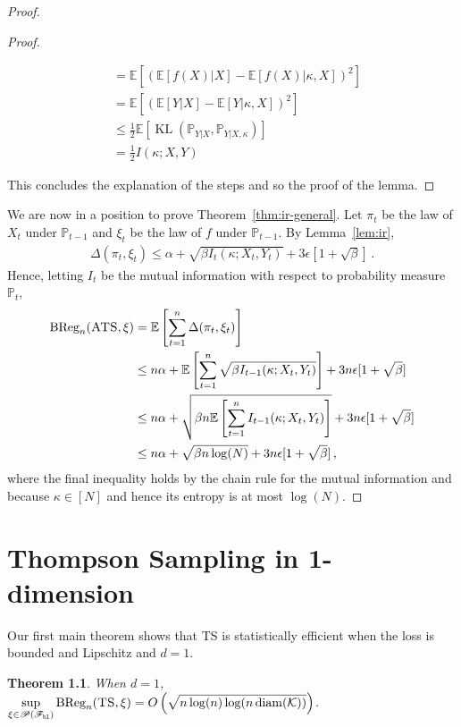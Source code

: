 \documentclass[letter, 12pt]{report}
\newcommand{\pb}{\text{\tiny\texttt{b}}}
\newcommand{\pl}{\text{\tiny\texttt{l}}}
\newcommand{\BReg}{\textrm{BReg}}
\newcommand{\KL}{\operatorname{KL}}
\newcommand{\E}{\mathbb E}
\newcommand{\cK}{\mathcal K}
\newcommand{\sF}{\mathscr F}
\newcommand{\sP}{\mathscr P}
\newcommand{\bbP}{\mathbb P}
\newcommand{\diam}{\operatorname{diam}}
\newcommand{\1}{\mathbf{1}}
\newcommand{\ts}{\textsc{TS}\xspace}
\newcommand{\ats}{\textsc{ATS}}
\theoremstyle{plain}
\newtheorem{theorem}{Theorem}
\theoremstyle{definition}
\theoremstyle{remark}
\begin{document}
\begin{proof}
\begin{proof}
\begin{enumerate}
\begin{align*}
                       & = \E[(\E[f(X)|X] - \E[f(X)|\kappa,X])^2]                 \\
                       & = \E[(\E[Y|X] - \E[Y|\kappa,X])^2]                       \\
                       & \leq \frac{1}{2} \E[ \KL(\bbP_{Y|X}, \bbP_{Y|X,\kappa})] \\
                       & = \frac{1}{2} I(\kappa ; X, Y)
                  \end{align*}
        \end{enumerate}
        This concludes the explanation of the steps and so the proof of the lemma.
    \end{proof}

    We are now in a position to prove Theorem~\ref{thm:ir-general}.
    Let $\pi_t$ be the law of $X_t$ under $\bbP_{t-1}$ and $\xi_t$ be the law of $f$ under $\bbP_{t-1}$.
    By Lemma~\ref{lem:ir},
    \begin{align*}
        \Delta(\pi_t, \xi_t) \leq \alpha + \sqrt{\beta I_t(\kappa ; X_t, Y_t)} + 3\epsilon[1 + \sqrt{\beta}]\,.
    \end{align*}
    Hence, letting $I_t$ be the mutual information with respect to probability measure $\bbP_t$,
    \begin{align*}
        \BReg_n(\ats, \xi)
         & = \E\left[\sum_{t=1}^n \Delta(\pi_t, \xi_t)\right]                                                                     \\
         & \leq n \alpha + \E\left[\sum_{t=1}^n \sqrt{\beta I_{t-1}(\kappa ; X_t, Y_t)}\right] + 3n \epsilon[1 + \sqrt{\beta}]    \\
         & \leq n \alpha + \sqrt{\beta n \E\left[\sum_{t=1}^n I_{t-1}(\kappa ; X_t, Y_t)\right]} + 3n \epsilon [1 + \sqrt{\beta}] \\
         & \leq n \alpha + \sqrt{\beta n \log(N)} + 3n \epsilon [1 + \sqrt{\beta}] \,,
    \end{align*}
    where the final inequality holds by the chain rule for the mutual information and because $\kappa \in [N]$ and hence its entropy is at most $\log(N)$.
\end{proof}

\chapter{Thompson Sampling in 1-dimension}
Our first main theorem shows that \ts{} is statistically efficient when the loss is bounded and Lipschitz and $d = 1$.
\begin{theorem}\label{thm:ts-1d}
    When $d = 1$, $\displaystyle \sup_{\xi \in \sP(\sF_{\pb\pl})} \BReg_n(\ts, \xi) = O\left(\sqrt{n \log(n) \log(n \diam(\cK))}\right)$.
\end{theorem}
\end{document}
